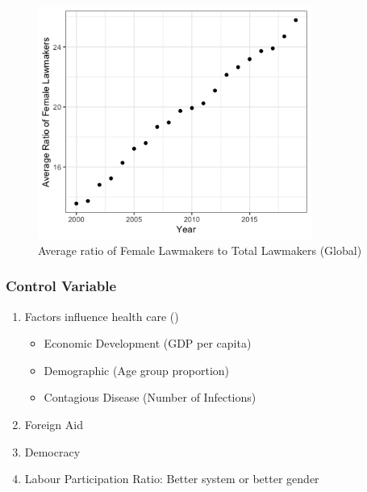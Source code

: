 \documentclass[12pt]{beamer}
\begin{document}
\begin{frame}[plain]
\begin{figure}
\centering
\includegraphics[width=0.8\textwidth]{figure/Lawmaker_Point.png}	
\caption{Average ratio of Female Lawmakers to Total Lawmakers (Global)}
\end{figure}
\end{frame}


\begin{frame}
	\frametitle{Control Variable}
	\begin{enumerate}
		\item Factors influence health care (\quad{})
		\begin{itemize}
			\item Economic Development (GDP per capita)
			\item Demographic (Age group proportion)
			\item Contagious Disease (Number of Infections)
		\end{itemize}
		\item Foreign Aid
		\item Democracy
		\item Labour Participation Ratio: Better system or better gender \cite{Sung2003}
	\end{enumerate}
\end{frame}
\end{document}
